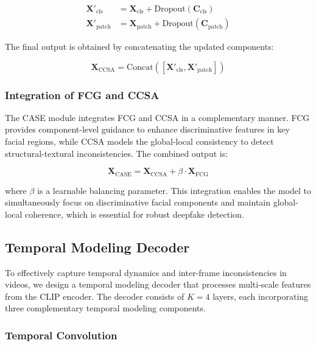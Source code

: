 \begin{equation}
\begin{aligned}
\mathbf{X}'_{\text{cls}} &= \mathbf{X}_{\text{cls}} + \text{Dropout}(\mathbf{C}_{\text{cls}}) \\
\mathbf{X}'_{\text{patch}} &= \mathbf{X}_{\text{patch}} + \text{Dropout}(\mathbf{C}_{\text{patch}})
\end{aligned}
\end{equation}

The final output is obtained by concatenating the updated components:

\begin{equation}
\mathbf{X}_{\text{CCSA}} = \text{Concat}([\mathbf{X}'_{\text{cls}}, \mathbf{X}'_{\text{patch}}])
\end{equation}

\subsubsection{Integration of FCG and CCSA}

The CASE module integrates FCG and CCSA in a complementary manner. FCG provides component-level guidance to enhance discriminative features in key facial regions, while CCSA models the global-local consistency to detect structural-textural inconsistencies. The combined output is:

\begin{equation}
\mathbf{X}_{\text{CASE}} = \mathbf{X}_{\text{CCSA}} + \beta \cdot \mathbf{X}_{\text{FCG}}
\end{equation}

where $\beta$ is a learnable balancing parameter. This integration enables the model to simultaneously focus on discriminative facial components and maintain global-local coherence, which is essential for robust deepfake detection.

\subsection{Temporal Modeling Decoder}

To effectively capture temporal dynamics and inter-frame inconsistencies in videos, we design a temporal modeling decoder that processes multi-scale features from the CLIP encoder. The decoder consists of $K=4$ layers, each incorporating three complementary temporal modeling components.

\subsubsection{Temporal Convolution}

